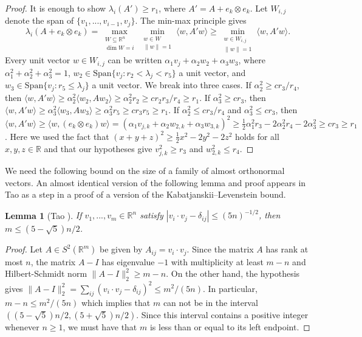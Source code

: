 \documentclass{amsart}
\newtheorem{lemma}[equation]{Lemma}
\numberwithin{equation}{section}
\numberwithin{figure}{section}
\newcommand{\R}{\mathbb{R}}
\begin{document}
\begin{proof}
It is enough to show $\lambda_i(A') \geq r_1$, where $A' = A + e_k \otimes e_k$.  Let $W_{i,j}$ denote the span of $\{ v_1, ..., v_{i-1}, v_j \}$.  The min-max principle gives
\begin{equation*}
\lambda_i(A + e_k \otimes e_k)
 = \max_{\substack{W \subseteq \R^n \\ \dim W = i}} \min_{\substack{w \in W \\ \|w\| = 1}} \langle w, A' w \rangle
 \geq \min_{\substack{w \in W_{i,j} \\ \|w\| = 1}} \langle w, A' w \rangle.
\end{equation*}
Every unit vector $w \in W_{i,j}$ can be written $\alpha_1 v_j + \alpha_2 w_2 + \alpha_3 w_3$, where $\alpha_1^2 + \alpha_2^2 + \alpha_3^2 = 1$, $w_2 \in \mathrm{Span}\{ v_j : r_2 < \lambda_j < r_5 \}$ a unit vector, and $w_3 \in \mathrm{Span} \{ v_j : r_5 \leq \lambda_j \}$ a unit vector.   We break into three cases.  If $\alpha_2^2 \geq c r_3 / r_4$, then $\langle w, A' w \rangle \geq \alpha_2^2 \langle w_2, A w_2 \rangle \geq \alpha_2^2 r_2 \geq c r_2 r_3 / r_4 \geq r_1$.  If $\alpha_3^2 \geq c r_3$, then $\langle w, A' w \rangle \geq \alpha_3^2 \langle w_3, A w_3 \rangle \geq \alpha_3^2 r_5 \geq c r_3 r_5 \geq r_1$.  If $\alpha_2^2 \leq c r_3 / r_4$ and $\alpha_3^2 \leq c r_3$, then $\langle w, A' w \rangle \geq \langle w, (e_k \otimes e_k) w \rangle = (\alpha_1 v_{j,k} + \alpha_2 w_{2,k} + \alpha_3 w_{3,k})^2 \geq \tfrac12 \alpha_1^2 r_3 - 2 \alpha_2^2 r_4 - 2 \alpha_3^2 \geq c r_3 \geq r_1$.  Here we used the fact that $(x+y+z)^2 \geq \tfrac12 x^2 - 2 y^2 - 2 z^2$ holds for all $x, y, z \in \R$ and that our hypotheses give $v_{j,k}^2 \geq r_3$ and $w_{2,k}^2 \leq r_4$.
\end{proof}

We need the following bound on the size of a family of almost orthonormal vectors.  An almost identical version of the following lemma and proof appears in Tao \cite{Tao} as a step in a proof of a version of the Kabatjanskii--Levenstein \cite{Kabatjanskii-Levenstein} bound.

\begin{lemma}[Tao \cite{Tao}]
  \label{l.kl}
  If $v_1, ..., v_m \in \R^n$ satisfy $|v_i \cdot v_j - \delta_{ij}| \leq (5n)^{-1/2}$, then $m \leq (5 - \sqrt 5) n / 2$.
\end{lemma}

\begin{proof}
   Let $A \in S^2(\R^m)$ be given by $A_{ij} = v_i \cdot v_j$.  Since the matrix $A$ has rank at most $n$, the matrix $A - I$ has eigenvalue $-1$ with multiplicity at least $m - n$ and Hilbert-Schmidt norm $\|A - I\|_2^2 \geq m - n$.  On the other hand, the hypothesis gives $\|A - I\|_2^2 = \sum_{ij} (v_i \cdot v_j - \delta_{ij})^2 \leq m^2 / (5 n)$.  In particular, $m - n \leq m^2/(5n)$ which implies that $m$ can not be in the interval $((5-\sqrt 5)n/2,(5+\sqrt 5)n/2)$.  Since this interval contains a positive integer whenever $n \geq 1$, we must have that $m$ is less than or equal to its left endpoint.
\end{proof}
\end{document}

